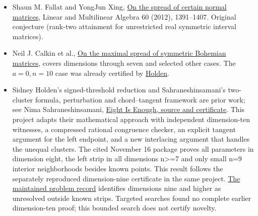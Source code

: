 \documentclass[11pt]{article}
\newcommand{\tightlist}{\setlength{\itemsep}{2pt}\setlength{\parskip}{0pt}}
\begin{document}
\begin{itemize}
\tightlist
\item
  Shaun M. Fallat and YongJun Xing, \href{https://doi.org/10.1080/03081087.2012.703189}{On the spread of certain normal matrices}, Linear and Multilinear Algebra 60 (2012), 1391--1407. Original conjecture (rank-two attainment for unrestricted real symmetric interval matrices).
\item
  Neil J. Calkin et al., \href{https://arxiv.org/abs/2510.15919}{On the maximal spread of symmetric Bohemian matrices}, covers dimensions through seven and selected other cases. The \(a=0,n=10\) case was already certified by \href{https://github.com/ajt60gaibb/OpenProblemsInNLA/blob/main/eigenvalues-and-inverse-problems/SP-08/README.md}{Holden}.
\item
  Sidney Holden's signed-threshold reduction and Sahraneshinsamani's two-cluster formula, perturbation and chord--tangent framework are prior work; see Nima Sahraneshinsamani, \href{https://github.com/snima/sp08-dimension-eight/tree/cf035d2d7ff9db0b0a16471891fe413bd59281ef}{Eight Is Enough, source and certificate}. This project adapts their mathematical approach with independent dimension-ten witnesses, a compressed rational congruence checker, an explicit tangent argument for the left endpoint, and a new interlacing argument that handles the unequal clusters. The cited November 16 package proves all parameters in dimension eight, the left strip in all dimensions n\textgreater=7 and only small n=9 interior neighborhoods besides known points. This result follows the separately reproduced dimension-nine certificate in the same project. \href{https://github.com/ajt60gaibb/OpenProblemsInNLA/blob/main/eigenvalues-and-inverse-problems/SP-08/README.md}{The maintained problem record} identifies dimensions nine and higher as unresolved outside known strips. Targeted searches found no complete earlier dimension-ten proof; this bounded search does not certify novelty.
\end{itemize}
\end{document}
